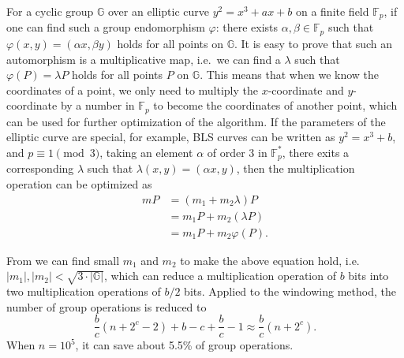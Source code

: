 For a cyclic group $\mathbb{G}$ over an elliptic curve $y^2 = x^3 + ax + b$ on a finite field $\mathbb{F}_p$, if one can find such a group endomorphism $\varphi$:
there exists $\alpha, \beta \in \mathbb{F}_p$ such that $\varphi(x, y) = (\alpha x, \beta y)$ holds for all points on $\mathbb{G}$. It is easy to prove that such an automorphism is a multiplicative map, i.e.\ we can find a $\lambda$ such that $\varphi(P) = \lambda P$ holds for all points $P$ on $\mathbb{G}$. This means that when we know the coordinates of a point, we only need to multiply the $x$-coordinate and $y$-coordinate by a number in $\mathbb{F}_p$ to become the coordinates of another point, which can be used for further optimization of the algorithm. If the parameters of the elliptic curve are special, for example, BLS curves can be written as $y^2 = x^3 + b$, and $p \equiv 1 \pmod 3$, taking an element $\alpha$ of order 3 in $\mathbb{F}_p^*$, there exits a corresponding $\lambda$ such that $\lambda (x, y) = (\alpha x, y)$, then the multiplication operation can be optimized as
\begin{align*}
    mP &= (m_1 + m_2\lambda)P \\
    &= m_1P + m_2(\lambda P) \\
    &= m_1P + m_2\varphi(P).
\end{align*}

From \cite{scq03} we can find small $m_1$ and $m_2$ to make the above equation hold, i.e.\ $|m_1|, |m_2| < \sqrt{3 \cdot |\mathbb{G}|}$, which can reduce a multiplication operation of $b$ bits into two multiplication operations of $b/2$ bits. Applied to the windowing method, the number of group operations is reduced to \[ \frac{b}{c}(n+2^c-2) + b-c+\frac{b}{c}-1 \approx \frac{b}{c}(n+2^c). \]
When $n = 10^5$, it can save about 5.5\% of group operations.
